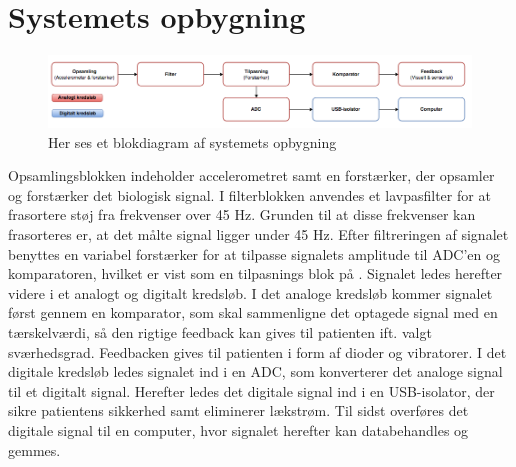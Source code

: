 \section{Systemets opbygning}
\begin{figure}[H]
	\centering
	\includegraphics[scale=0.47]{figures/Blokdiagram.jpg}
	\caption{Her ses et blokdiagram af systemets opbygning}
	\label{Blokdiagram}
\end{figure}

Opsamlingsblokken indeholder accelerometret samt en forstærker, der opsamler og forstærker det biologisk signal. %
I filterblokken anvendes et lavpasfilter for at frasortere støj fra frekvenser over 45 Hz. Grunden til at disse frekvenser kan frasorteres er, at det målte signal ligger under 45 Hz. Efter filtreringen af signalet benyttes en variabel forstærker for at tilpasse signalets amplitude til ADC’en og komparatoren, hvilket er vist som en tilpasnings blok på . Signalet ledes herefter videre i et analogt og digitalt kredsløb. I det analoge kredsløb kommer signalet først gennem en komparator, som skal sammenligne det optagede signal med en tærskelværdi, så den rigtige feedback kan gives til patienten ift. valgt sværhedsgrad. Feedbacken gives til patienten i form af dioder og vibratorer. I det digitale kredsløb ledes signalet ind i en ADC, som konverterer det analoge signal til et digitalt signal. Herefter ledes det digitale signal ind i en USB-isolator, der sikre patientens sikkerhed samt eliminerer lækstrøm. Til sidst overføres det digitale signal til en computer, hvor signalet herefter kan databehandles og gemmes.